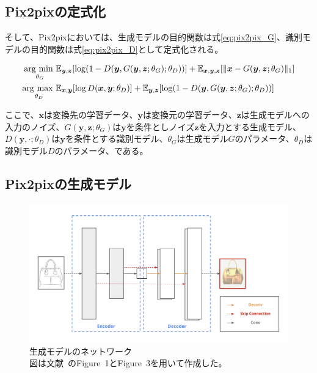 \subsection{Pix2pixの定式化}

そして、Pix2pixにおいては、生成モデルの目的関数は式\ref{eq:pix2pix_G}、識別モデルの目的関数は式\ref{eq:pix2pix_D}として定式化される。

\begin{align}
    \label{eq:pix2pix_G}
    \mathop{\rm arg~min~}\limits _{\theta_G}& \mathbb{E}_{\boldsymbol{y}, \boldsymbol{z}}[\log (1-D(\boldsymbol{y}, G(\boldsymbol{y}, \boldsymbol{z}; \theta_G); \theta_D))]+\mathbb{E}_{\boldsymbol{x}, \boldsymbol{y}, \boldsymbol{z}}[\|\boldsymbol{x}-G(\boldsymbol{y}, \boldsymbol{z}; \theta_G)\|_{1}]\\
    \label{eq:pix2pix_D}
    \mathop{\rm arg~max~}\limits _{\theta_D}& \mathbb{E}_{\boldsymbol{x}, \boldsymbol{y}}[\log D(\boldsymbol{x}, \boldsymbol{y}; \theta_D)]+\mathbb{E}_{\boldsymbol{y}, \boldsymbol{z}}[\log (1-D(\boldsymbol{y}, G(\boldsymbol{y}, \boldsymbol{z}; \theta_G); \theta_D))]
\end{align}

ここで、$\boldsymbol{x}$は変換先の学習データ、$\boldsymbol{y}$は変換元の学習データ、$\boldsymbol{z}$は生成モデルへの入力のノイズ、$G(\boldsymbol{y},\boldsymbol{z};\theta_G)$は$\boldsymbol{y}$を条件としノイズ$\boldsymbol{z}$を入力とする生成モデル、$D(\boldsymbol{y},\cdot;\theta_D)$は$\boldsymbol{y}$を条件とする識別モデル、$\theta_G$は生成モデル$G$のパラメータ、$\theta_D$は識別モデル$D$のパラメータ、である。

\subsection{Pix2pixの生成モデル}

\begin{figure}[t]
\begin{center}
\includegraphics[width=0.95\hsize]{figure/u-net.png}
\caption{生成モデルのネットワーク\\
図は文献~\cite{pix2pix}のFigure~1とFigure~3を用いて作成した。}
\label{fig:u-net}
\end{center}
\end{figure}

